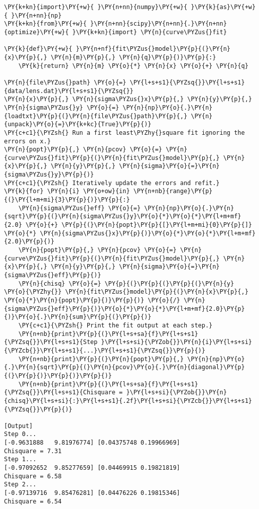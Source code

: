 \begin{Verbatim}[label=\makebox{\href{https://github.com/unipi-physics-labs/lab1-notes/tree/main/snippy/least_squares_modified.py}{https://github.com/.../least\_squares\_modified.py}},commandchars=\\\{\}]
\PY{k+kn}{import}\PY{+w}{ }\PY{n+nn}{numpy}\PY{+w}{ }\PY{k}{as}\PY{+w}{ }\PY{n+nn}{np}
\PY{k+kn}{from}\PY{+w}{ }\PY{n+nn}{scipy}\PY{n+nn}{.}\PY{n+nn}{optimize}\PY{+w}{ }\PY{k+kn}{import} \PY{n}{curve\PYZus{}fit}

\PY{k}{def}\PY{+w}{ }\PY{n+nf}{fit\PYZus{}model}\PY{p}{(}\PY{n}{x}\PY{p}{,} \PY{n}{m}\PY{p}{,} \PY{n}{q}\PY{p}{)}\PY{p}{:}
    \PY{k}{return} \PY{n}{m} \PY{o}{*} \PY{n}{x} \PY{o}{+} \PY{n}{q}

\PY{n}{file\PYZus{}path} \PY{o}{=} \PY{l+s+s1}{\PYZsq{}}\PY{l+s+s1}{data/lens.dat}\PY{l+s+s1}{\PYZsq{}}
\PY{n}{x}\PY{p}{,} \PY{n}{sigma\PYZus{}x}\PY{p}{,} \PY{n}{y}\PY{p}{,} \PY{n}{sigma\PYZus{}y} \PY{o}{=} \PY{n}{np}\PY{o}{.}\PY{n}{loadtxt}\PY{p}{(}\PY{n}{file\PYZus{}path}\PY{p}{,} \PY{n}{unpack}\PY{o}{=}\PY{k+kc}{True}\PY{p}{)}
\PY{c+c1}{\PYZsh{} Run a first least\PYZhy{}square fit ignoring the errors on x.}
\PY{n}{popt}\PY{p}{,} \PY{n}{pcov} \PY{o}{=} \PY{n}{curve\PYZus{}fit}\PY{p}{(}\PY{n}{fit\PYZus{}model}\PY{p}{,} \PY{n}{x}\PY{p}{,} \PY{n}{y}\PY{p}{,} \PY{n}{sigma}\PY{o}{=}\PY{n}{sigma\PYZus{}y}\PY{p}{)}
\PY{c+c1}{\PYZsh{} Iteratively update the errors and refit.}
\PY{k}{for} \PY{n}{i} \PY{o+ow}{in} \PY{n+nb}{range}\PY{p}{(}\PY{l+m+mi}{3}\PY{p}{)}\PY{p}{:}
    \PY{n}{sigma\PYZus{}eff} \PY{o}{=} \PY{n}{np}\PY{o}{.}\PY{n}{sqrt}\PY{p}{(}\PY{n}{sigma\PYZus{}y}\PY{o}{*}\PY{o}{*}\PY{l+m+mf}{2.0} \PY{o}{+} \PY{p}{(}\PY{n}{popt}\PY{p}{[}\PY{l+m+mi}{0}\PY{p}{]} \PY{o}{*} \PY{n}{sigma\PYZus{}x}\PY{p}{)}\PY{o}{*}\PY{o}{*}\PY{l+m+mf}{2.0}\PY{p}{)}
    \PY{n}{popt}\PY{p}{,} \PY{n}{pcov} \PY{o}{=} \PY{n}{curve\PYZus{}fit}\PY{p}{(}\PY{n}{fit\PYZus{}model}\PY{p}{,} \PY{n}{x}\PY{p}{,} \PY{n}{y}\PY{p}{,} \PY{n}{sigma}\PY{o}{=}\PY{n}{sigma\PYZus{}eff}\PY{p}{)}
    \PY{n}{chisq} \PY{o}{=} \PY{p}{(}\PY{p}{(}\PY{p}{(}\PY{n}{y} \PY{o}{\PYZhy{}} \PY{n}{fit\PYZus{}model}\PY{p}{(}\PY{n}{x}\PY{p}{,} \PY{o}{*}\PY{n}{popt}\PY{p}{)}\PY{p}{)} \PY{o}{/} \PY{n}{sigma\PYZus{}eff}\PY{p}{)}\PY{o}{*}\PY{o}{*}\PY{l+m+mf}{2.0}\PY{p}{)}\PY{o}{.}\PY{n}{sum}\PY{p}{(}\PY{p}{)}
    \PY{c+c1}{\PYZsh{} Print the fit output at each step.}
    \PY{n+nb}{print}\PY{p}{(}\PY{l+s+sa}{f}\PY{l+s+s1}{\PYZsq{}}\PY{l+s+s1}{Step }\PY{l+s+si}{\PYZob{}}\PY{n}{i}\PY{l+s+si}{\PYZcb{}}\PY{l+s+s1}{...}\PY{l+s+s1}{\PYZsq{}}\PY{p}{)}
    \PY{n+nb}{print}\PY{p}{(}\PY{n}{popt}\PY{p}{,} \PY{n}{np}\PY{o}{.}\PY{n}{sqrt}\PY{p}{(}\PY{n}{pcov}\PY{o}{.}\PY{n}{diagonal}\PY{p}{(}\PY{p}{)}\PY{p}{)}\PY{p}{)}
    \PY{n+nb}{print}\PY{p}{(}\PY{l+s+sa}{f}\PY{l+s+s1}{\PYZsq{}}\PY{l+s+s1}{Chisquare = }\PY{l+s+si}{\PYZob{}}\PY{n}{chisq}\PY{l+s+si}{:}\PY{l+s+s1}{.2f}\PY{l+s+si}{\PYZcb{}}\PY{l+s+s1}{\PYZsq{}}\PY{p}{)}

[Output]
Step 0...
[-0.9631888   9.81976774] [0.04375748 0.19966969]
Chisquare = 7.31
Step 1...
[-0.97092652  9.85277659] [0.04469915 0.19821819]
Chisquare = 6.58
Step 2...
[-0.97139716  9.85476281] [0.04476226 0.19815346]
Chisquare = 6.54
\end{Verbatim}
